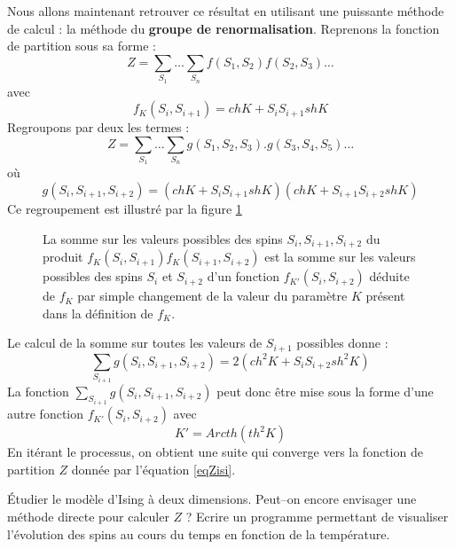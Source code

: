 \documentclass[12pt]{book}
\begin{document}
Nous
allons maintenant retrouver ce r\'esultat en utilisant une puissante
m\'ethode de calcul : la 
m\'ethode du {\bf groupe de
renormalisation}\cite{ph:physt:Diu89,ma:equad:Schuster88}. 
Reprenons la fonction de partition sous sa forme :
\begin{equation}
Z=\sum_{S_1}\dots\sum_{S_n}f(S_1,S_2)f(S_2,S_3)\dots
\end{equation}
avec
\begin{equation}
f_{K}(S_i,S_{i+1})=ch K +S_iS_{i+1}sh K
\end{equation}
Regroupons par deux les termes :
\begin{equation}
Z=\sum_{S_1}\dots\sum_{S_n}g(S_1,S_2,S_3).g(S_3,S_4,S_5)\dots
\end{equation}
o\`u 
\begin{equation}
g(S_i,S_{i+1},S_{i+2})=(ch K +S_iS_{i+1}sh K)(ch K +S_{i+1}S_{i+2}sh K)
\end{equation}
Ce regroupement est illustr\'e par la figure \ref{figrenorm}
\begin{figure}[htb]
 \centerline{}   
 \caption{La somme sur les valeurs possibles des spins
$S_{i},S_{i+1},S_{i+2}$ du produit
$f_K(S_i,S_{i+1})f_K(S_{i+1},S_{i+2})$ est la somme  sur les valeurs
possibles des spins 
$S_{i}$ et $S_{i+2}$ d'un fonction $f_{K'}(S_{i},S_{i+2})$ 
d\'eduite de $f_K$ par simple changement de la valeur du param\`etre
$K$ pr\'esent dans la d\'efinition de $f_K$.} 
 \label{figrenorm}
\end{figure}
Le calcul de la somme sur toutes les valeurs de $S_{i+1}$ possibles
donne :
\begin{equation}
\sum_{S_{i+1}}g(S_i,S_{i+1},S_{i+2})=2(ch^2K+S_{i}S_{i+2}sh^2K)
\end{equation}
La fonction $\sum_{S_{i+1}}g(S_i,S_{i+1},S_{i+2})$ peut donc \^etre mise 
sous la forme d'une autre fonction $f_{K'}(S_i,S_{i+2})$ avec
\begin{equation}
K'=Arcth(th^2K)
\end{equation}
En it\'erant le processus, on obtient une suite qui converge vers la
fonction de partition $Z$ donn\'ee par l'\'equation \ref{eqZisi}.
\begin{exo}
\'Etudier le mod\`ele d'Ising \`a deux dimensions. Peut--on encore envisager
une m\'ethode directe pour calculer $Z$ ? Ecrire un programme permettant de
visualiser l'\'evolution des spins au cours du temps en fonction de la
temp\'erature. 
\end{exo}
\end{document}
